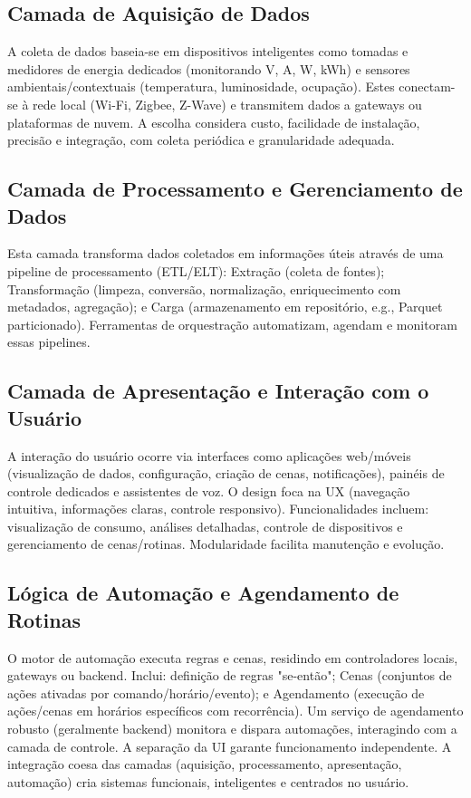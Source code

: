 \subsection{Camada de Aquisição de Dados}
\label{subsec:camada_aquisicao}
A coleta de dados baseia-se em dispositivos inteligentes como tomadas e medidores de energia dedicados (monitorando V, A, W, kWh) e sensores ambientais/contextuais (temperatura, luminosidade, ocupação). Estes conectam-se à rede local (Wi-Fi, Zigbee, Z-Wave) e transmitem dados a gateways ou plataformas de nuvem. A escolha considera custo, facilidade de instalação, precisão e integração, com coleta periódica e granularidade adequada.

\subsection{Camada de Processamento e Gerenciamento de Dados}
\label{subsec:camada_processamento}
Esta camada transforma dados coletados em informações úteis através de uma pipeline de processamento (ETL/ELT): Extração (coleta de fontes); Transformação (limpeza, conversão, normalização, enriquecimento com metadados, agregação); e Carga (armazenamento em repositório, e.g., Parquet particionado). Ferramentas de orquestração automatizam, agendam e monitoram essas pipelines.

\subsection{Camada de Apresentação e Interação com o Usuário}
\label{subsec:camada_apresentacao}
A interação do usuário ocorre via interfaces como aplicações web/móveis (visualização de dados, configuração, criação de cenas, notificações), painéis de controle dedicados e assistentes de voz. O design foca na UX (navegação intuitiva, informações claras, controle responsivo). Funcionalidades incluem: visualização de consumo, análises detalhadas, controle de dispositivos e gerenciamento de cenas/rotinas. Modularidade facilita manutenção e evolução.

\subsection{Lógica de Automação e Agendamento de Rotinas}
\label{subsec:logica_automacao}
O motor de automação executa regras e cenas, residindo em controladores locais, gateways ou backend. Inclui: definição de regras "se-então"; Cenas (conjuntos de ações ativadas por comando/horário/evento); e Agendamento (execução de ações/cenas em horários específicos com recorrência). Um serviço de agendamento robusto (geralmente backend) monitora e dispara automações, interagindo com a camada de controle. A separação da UI garante funcionamento independente. A integração coesa das camadas (aquisição, processamento, apresentação, automação) cria sistemas funcionais, inteligentes e centrados no usuário.

